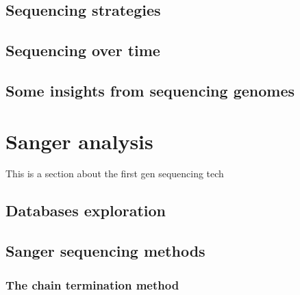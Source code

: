 \documentclass[
  letterpaper,
  DIV=11,
  numbers=noendperiod]{scrreprt}
\begin{document}
\hypertarget{sequencing-strategies}{%
\section*{Sequencing strategies}\label{sequencing-strategies}}

\hypertarget{sequencing-over-time}{%
\section*{Sequencing over time}\label{sequencing-over-time}}

\hypertarget{some-insights-from-sequencing-genomes}{%
\section*{Some insights from sequencing
genomes}\label{some-insights-from-sequencing-genomes}}

\hypertarget{sanger-analysis}{%
\chapter{Sanger analysis}\label{sanger-analysis}}

This is a section about the first gen sequencing tech

\hypertarget{databases-exploration}{%
\section*{Databases exploration}\label{databases-exploration}}

\hypertarget{sanger-sequencing-methods}{%
\section*{Sanger sequencing methods}\label{sanger-sequencing-methods}}

\hypertarget{the-chain-termination-method}{%
\subsection*{The chain termination
method}\label{the-chain-termination-method}}
\end{document}
